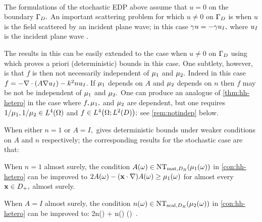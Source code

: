 \label{rem:planewave}

\

The formulations of the stochastic EDP above assume that $u=0$ on the boundary $\Gamma_{D}.$ An important scattering problem for which $u \neq 0$ on $\Gamma_{D}$ is when $u$ is the field scattered by an incident plane wave; in this case $\gamma u = -\gamma u_{I},$ where $u_{I}$ is the incident plane wave \cite[p. 107]{ChGrLaSp:12}.

The results in this  can be easily extended to the case when $u\neq0$ on $\Gamma_{D}$ using \cite[Theorem 2.19(ii)]{GrPeSp:19}  which proves a priori (deterministic) bounds in this case. One subtlety, however, is that $f$ is then not necessarily independent of $\mu_{1}$ and $\mu_{2}.$ Indeed in this case
$f = -\grad\cdot\mleft(A\grad \uI\mright) - k^2n\uI$.
If $\mu_{1}$ depends on $A$ and $\mu_{2}$ depends on $n$ then %
$f$ may be not be independent of $\mu_{1}$ and $\mu_{2}.$ One can produce an analogue of \cref{thm:hh-hetero} in the case where $f,\mu_{1},$ and $\mu_{2}$ are dependent, but one requires $1/\muo, 1/\mut \in \LfO$ and $f \in \LfOLtD;$ see \cref{rem:notindep} below.
\ere

\bre[The case when either $n=1$ or $A=I$]\label{rem:ones}
When either $n=1$ or $A=I,$ \cite[Theorem 2.19]{GrPeSp:19} gives deterministic bounds under weaker conditions on $A$ and $n$ respectively; the corresponding results for the stochastic case are that:

\bit
\item 

When $n=1$  almost surely, the condition $A(\omega) \in \NTA{\muo(\omega)}$ in \cref{con:hh-hetero} can be improved to
$2A(\omega) - \mleft(\bx \cdot \nabla \mright)A(\omega) \geq \muo(\omega)$
for almost every $\mathbf{x}\in D_{+},$ almost surely.

\item When $A=I$ almost surely, the condition $n(\omega) \in \NTn{\mut(\omega)}$ in \cref{con:hh-hetero} can be improved to:
\beq\label{eq:nimproved}
2n(\omega) + \bx \cdot \nabla n(\omega) \geq \mut(\omega) \,.
\eeq
\eit
\ere


